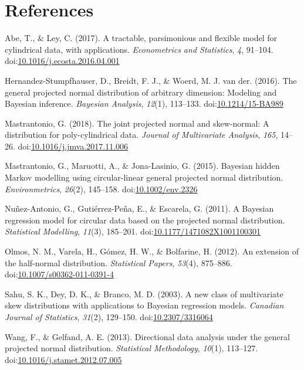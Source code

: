 \documentclass[12pt,]{article}
\begin{document}
\section*{References}

\hypertarget{refs}{}
\leavevmode\hypertarget{ref-abe2017tractable}{}%
Abe, T., \& Ley, C. (2017). A tractable, parsimonious and flexible model
for cylindrical data, with applications. \emph{Econometrics and
Statistics}, \emph{4}, 91--104.
doi:\href{https://doi.org/10.1016/j.ecosta.2016.04.001}{10.1016/j.ecosta.2016.04.001}

\leavevmode\hypertarget{ref-hernandez2016general}{}%
Hernandez-Stumpfhauser, D., Breidt, F. J., \& Woerd, M. J. van der.
(2016). The general projected normal distribution of arbitrary
dimension: Modeling and Bayesian inference. \emph{Bayesian Analysis},
\emph{12}(1), 113--133.
doi:\href{https://doi.org/10.1214/15-BA989}{10.1214/15-BA989}

\leavevmode\hypertarget{ref-mastrantonio2018joint}{}%
Mastrantonio, G. (2018). The joint projected normal and skew-normal: A
distribution for poly-cylindrical data. \emph{Journal of Multivariate
Analysis}, \emph{165}, 14--26.
doi:\href{https://doi.org/10.1016/j.jmva.2017.11.006}{10.1016/j.jmva.2017.11.006}

\leavevmode\hypertarget{ref-mastrantonio2015bayesian}{}%
Mastrantonio, G., Maruotti, A., \& Jona-Lasinio, G. (2015). Bayesian
hidden Markov modelling using circular-linear general projected normal
distribution. \emph{Environmetrics}, \emph{26}(2), 145--158.
doi:\href{https://doi.org/10.1002/env.2326}{10.1002/env.2326}

\leavevmode\hypertarget{ref-nunez2011bayesian}{}%
Nuñez-Antonio, G., Gutiérrez-Peña, E., \& Escarela, G. (2011). A
Bayesian regression model for circular data based on the projected
normal distribution. \emph{Statistical Modelling}, \emph{11}(3),
185--201.
doi:\href{https://doi.org/10.1177/1471082X1001100301}{10.1177/1471082X1001100301}

\leavevmode\hypertarget{ref-olmos2012extension}{}%
Olmos, N. M., Varela, H., Gómez, H. W., \& Bolfarine, H. (2012). An
extension of the half-normal distribution. \emph{Statistical Papers},
\emph{53}(4), 875--886.
doi:\href{https://doi.org/10.1007/s00362-011-0391-4}{10.1007/s00362-011-0391-4}

\leavevmode\hypertarget{ref-sahu2003new}{}%
Sahu, S. K., Dey, D. K., \& Branco, M. D. (2003). A new class of
multivariate skew distributions with applications to Bayesian regression
models. \emph{Canadian Journal of Statistics}, \emph{31}(2), 129--150.
doi:\href{https://doi.org/10.2307/3316064}{10.2307/3316064}

\leavevmode\hypertarget{ref-wang2012directional}{}%
Wang, F., \& Gelfand, A. E. (2013). Directional data analysis under the
general projected normal distribution. \emph{Statistical Methodology},
\emph{10}(1), 113--127.
doi:\href{https://doi.org/10.1016/j.stamet.2012.07.005}{10.1016/j.stamet.2012.07.005}
\end{document}
